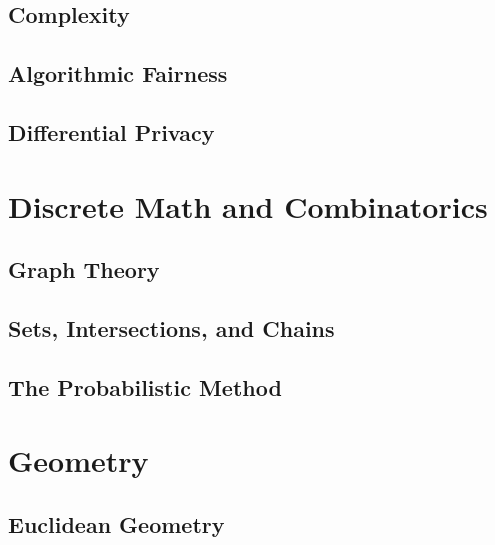 \documentclass[oneside,openany]{book}
\theoremstyle{definition}
\begin{document}
\chapter{Complexity}


\chapter{Algorithmic Fairness}


\chapter{Differential Privacy}



\part{Discrete Math and Combinatorics}

\chapter{Graph Theory}


\chapter{Sets, Intersections, and Chains}


\chapter{The Probabilistic Method}



\part{Geometry}

\chapter{Euclidean Geometry}

\end{document}
